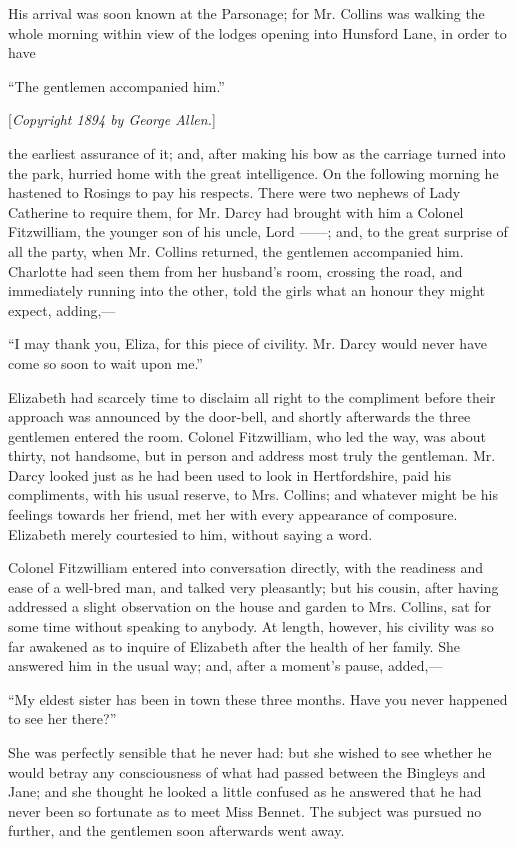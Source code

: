 \documentclass[12pt,openright]{book}
\begin{document}
His arrival was soon known at the Parsonage; for Mr. Collins was walking the whole morning within view of the lodges opening into Hunsford Lane, in order to have

“The gentlemen accompanied him.”


[\textit{Copyright 1894 by George Allen.}]

the earliest assurance of it; and, after making his bow as the carriage turned into the park, hurried home with the great intelligence. On the following morning he hastened to Rosings to pay his respects. There were two nephews of Lady Catherine to require them, for Mr. Darcy had brought with him a Colonel Fitzwilliam, the younger son of his uncle, Lord ——; and, to the great surprise of all the party, when Mr. Collins returned, the gentlemen accompanied him. Charlotte had seen them from her husband’s room, crossing the road, and immediately running into the other, told the girls what an honour they might expect, adding,—

“I may thank you, Eliza, for this piece of civility. Mr. Darcy would never have come so soon to wait upon me.”

Elizabeth had scarcely time to disclaim all right to the compliment before their approach was announced by the door-bell, and shortly afterwards the three gentlemen entered the room. Colonel Fitzwilliam, who led the way, was about thirty, not handsome, but in person and address most truly the gentleman. Mr. Darcy looked just as he had been used to look in Hertfordshire, paid his compliments, with his usual reserve, to Mrs. Collins; and whatever might be his feelings towards her friend, met her with every appearance of composure. Elizabeth merely courtesied to him, without saying a word.

Colonel Fitzwilliam entered into conversation directly, with the readiness and ease of a well-bred man, and talked very pleasantly; but his cousin, after having addressed a slight observation on the house and garden to Mrs. Collins, sat for some time without speaking to anybody. At length, however, his civility was so far awakened as to inquire of Elizabeth after the health of her family. She answered him in the usual way; and, after a moment’s pause, added,—

“My eldest sister has been in town these three months. Have you never happened to see her there?”

She was perfectly sensible that he never had: but she wished to see whether he would betray any consciousness of what had passed between the Bingleys and Jane; and she thought he looked a little confused as he answered that he had never been so fortunate as to meet Miss Bennet. The subject was pursued no further, and the gentlemen soon afterwards went away.
\end{document}
